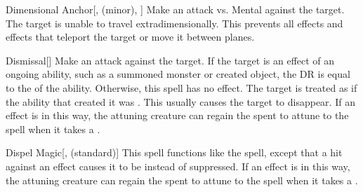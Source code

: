 \lowercase{\hypertarget{spell:Dimensional Anchor}{}}\label{spell:Dimensional Anchor}
\begin{freeability}[Rank 3]{\hypertarget{spell:Dimensional Anchor}{Dimensional Anchor}}[,  (minor), ]
Make an attack vs. Mental against the target.
\hit The target is unable to travel extradimensionally.
This prevents all  effects and effects that teleport the target or move it between planes.
\end{freeability}
\vspace{0.25em}



\lowercase{\hypertarget{spell:Dismissal}{}}\label{spell:Dismissal}
\begin{freeability}[Rank 3]{\hypertarget{spell:Dismissal}{Dismissal}}[]
Make an attack against the target.
If the target is an effect of an ongoing  ability, such as a summoned monster or created object, the DR is equal to the  of the ability.
Otherwise, this spell has no effect.
\hit The target is treated as if the ability that created it was .
This usually causes the target to disappear.
If an  effect is  in this way,
the attuning creature can regain the  spent to attune to the spell when it takes a .
\end{freeability}
\vspace{0.25em}



\lowercase{\hypertarget{spell:Dispel Magic}{}}\label{spell:Dispel Magic}
\begin{freeability}[Rank 3]{\hypertarget{spell:Dispel Magic}{Dispel Magic}}[,  (standard)]
This spell functions like the  spell, except that a hit against an effect causes it to be  instead of suppressed.
If an  effect is  in this way,
the attuning creature can regain the  spent to attune to the spell when it takes a .
\end{freeability}
\vspace{0.25em}



